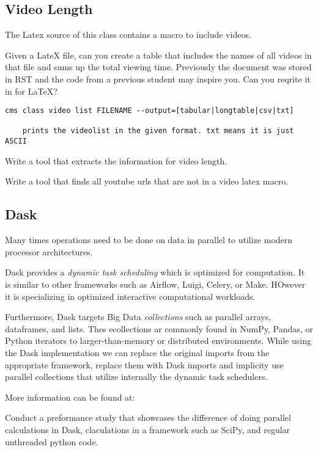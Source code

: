 \subsection{Video Length}

The Latex source of this class contains a macro to include videos.


Given a LateX file, can you create a table that includes the names of
all videos in that file and sums up the total viewing time. Previously
the document was stored in RST and the code from a previous student
may inspire you. Can you reqrite it in for LaTeX? 



\begin{lstlisting}
cms class video list FILENAME --output=[tabular|longtable|csv|txt]

    prints the videolist in the given format. txt means it is just ASCII
\end{lstlisting}

\begin{comment}
The previous work even summarized the video length by chapter.

see: https://piazza.com/class/j5wll7vzylg25j?cid=325
\end{comment}

\begin{exercise}
Write a tool that extracts the information for video length. 
\end{exercise}

\begin{exercise}
Write a tool that finds all youtube urls that are not in a video latex
macro.
\end{exercise}

\subsection{Dask}

Many times operations need to be done on data in parallel to utilize
modern processor architectures.


Dask provides a {\em dynamic task scheduling} which is optimized for
computation. It is similar to other frameworks such as Airflow, Luigi,
Celery, or Make. HOwever it is specializing in optimized interactive
computational workloads.

Furthermore, Dask targets Big Data {\em collections} such as parallel
arrays, dataframes, and lists. Thes ecollections ar commonly found in
NumPy, Pandas, or Python iterators to larger-than-memory or
distributed environments. While using the Dask implementation we can
replace the original imports from the appropriate framework, replace
them with Dask imports and implicity use parallel collections that
utilize internally the dynamic task schedulers.

More information can be found at:


\begin{exercise}
Conduct a preformance study that showcases the difference of doing
parallel calculations in Dask, claculations in a framework such as
SciPy, and regular unthreaded python code.
\end{exercise}

